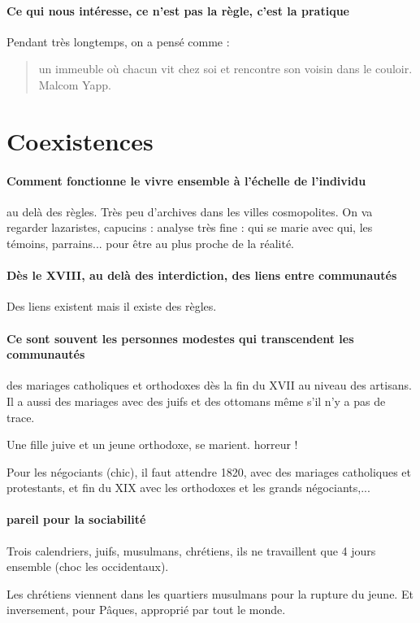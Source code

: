 \paragraph{Ce qui nous intéresse, ce n'est pas la règle, c'est la pratique} Pendant très longtemps, on a pensé comme :
\begin{quote}
    {un immeuble où chacun vit chez soi et rencontre son voisin dans le couloir. Malcom Yapp.}
\end{quote}


\section{Coexistences}

\paragraph{Comment fonctionne le vivre ensemble à l'échelle de l'individu} au delà des règles. 
Très peu d'archives dans les villes cosmopolites. On va regarder lazaristes, capucins : analyse très fine : qui se marie avec qui, les témoins, parrains... pour être au plus proche de la réalité.

\paragraph{Dès le XVIII, au delà des interdiction, des liens entre communautés} Des liens existent mais il existe des règles. 

\paragraph{Ce sont souvent les personnes modestes qui transcendent les communautés} des mariages catholiques et orthodoxes dès la fin du XVII au niveau des artisans. Il a aussi des mariages avec des juifs et des ottomans même s'il n'y a pas de trace.
\begin{Ex}
    Une fille juive et un jeune orthodoxe, se marient. horreur ! 
\end{Ex}
Pour les négociants (chic), il faut attendre 1820, avec des mariages catholiques et protestants, et fin du XIX avec les orthodoxes et les grands négociants,...

\paragraph{pareil pour la sociabilité} Trois calendriers, juifs, musulmans, chrétiens, ils ne travaillent que 4 jours ensemble (choc les occidentaux). 
\begin{Ex}
    Les chrétiens viennent dans les quartiers musulmans pour la rupture du jeune. Et inversement, pour Pâques, approprié par tout le monde.
\end{Ex}

